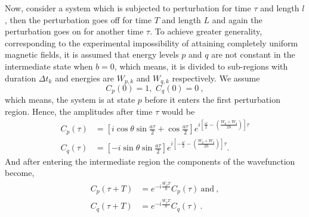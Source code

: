 Now, consider a system which is subjected to perturbation for time
$\tau$ and length $l$, then the perturbation goes off for time $T$ and
length $L$ and again the perturbation goes on for another time
$\tau$. To achieve greater generality, corresponding to the
experimental impossibility of attaining completely uniform magnetic
fields, it is assumed that energy levels $p$ and $q$ are not constant in
the intermediate state when $b=0$, which means, it is divided to
sub-regions with duration $\Delta t_k$ and energies are $W_{p,k}$ and
$W_{q,k}$ respectively. We assume
\begin{equation}
C_p(0)=1 , \, \, C_q(0)=0~,
\end{equation}
which means, the system is at state $p$ before it enters the first
perturbation region. Hence, the amplitudes after time $\tau$ would be
\begin{align}
C_p(\tau) &=\left[i \cos \theta \sin \frac{a\tau}{2}+ \cos \frac{a\tau}{2}\right]
e^{i\left[\frac{\omega}{2}-\left(\frac{W_p+W_q}{2\hbar}\right)\right]\tau}\\ \nonumber
C_q(\tau) &=\left[ -i \sin \theta \sin \frac{a\tau}{2} \right] 
e^{i \left[ -\frac{\omega}{2} - \left( \frac{W_p+W_q}{2\hbar}\right)\right]\tau} .
\end{align}
And after entering the intermediate region the components of the wavefunction become,
\begin{align}
  C_p(\tau+T)&=e^{-i \frac{\bar{W_p}T}{\hbar}} C_p(\tau) ~
\mathrm{and}~, \\
\nonumber
C_q(\tau+T)&=e^{-i \frac{\bar{W_q}T}{\hbar}} C_q(\tau)~.
\end{align}

